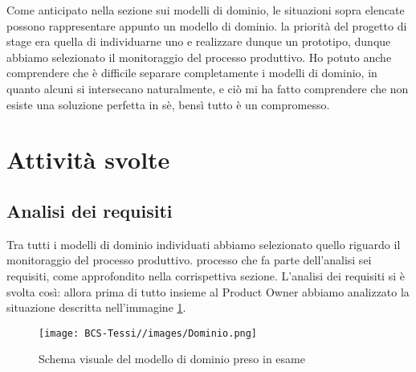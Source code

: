    Come anticipato nella sezione sui modelli di dominio, le situazioni sopra elencate possono rappresentare appunto un modello di dominio. la priorità del progetto di stage era quella di individuarne uno e realizzare dunque un prototipo, dunque abbiamo selezionato il monitoraggio del processo produttivo. 
    Ho potuto anche comprendere che è difficile separare completamente i modelli di dominio, in quanto alcuni si intersecano naturalmente, e ciò mi ha fatto comprendere che non esiste una soluzione perfetta in sè, bensì tutto è un compromesso. 
    

    
    \section{Attività svolte}
        \subsection{Analisi dei requisiti}
        Tra tutti i modelli di dominio individuati abbiamo selezionato quello riguardo il monitoraggio del processo produttivo. processo che fa parte dell'analisi sei requisiti, come approfondito nella corrispettiva sezione. 
        L'analisi dei requisiti si è svolta così: allora prima di tutto insieme al Product Owner abbiamo analizzato la situazione descritta nell'immagine \ref{fig:Dominio}.

        \begin{figure}[H]
            \centering
            \texttt{[image: BCS-Tessi//images/Dominio.png]}
            \caption{Schema visuale del modello di dominio preso in esame}
            \label{fig:Dominio}
        \end{figure}
        
